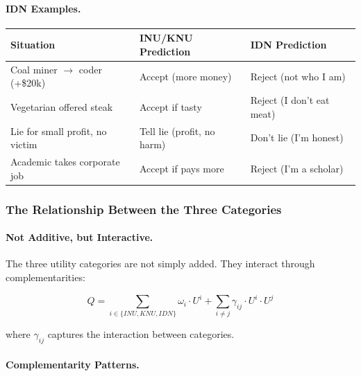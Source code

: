 \paragraph{IDN Examples.}

\begin{center}
\renewcommand{\arraystretch}{1.3}
\begin{tabular}{p{4cm}p{3.5cm}p{4.5cm}}
\toprule
\textbf{Situation} & \textbf{INU/KNU Prediction} & \textbf{IDN Prediction} \\
\midrule
Coal miner $\rightarrow$ coder (+\$20k) & Accept (more money) & Reject (not who I am) \\
Vegetarian offered steak & Accept if tasty & Reject (I don't eat meat) \\
Lie for small profit, no victim & Tell lie (profit, no harm) & Don't lie (I'm honest) \\
Academic takes corporate job & Accept if pays more & Reject (I'm a scholar) \\
\bottomrule
\end{tabular}
\end{center}

\subsubsection{The Relationship Between the Three Categories}

\paragraph{Not Additive, but Interactive.}
The three utility categories are not simply added.
They interact through complementarities:

\begin{equation}
Q = \sum_{i \in \{INU, KNU, IDN\}} \omega_i \cdot U^i + \sum_{i \neq j} \gamma_{ij} \cdot U^i \cdot U^j
\label{eq:utility-complementarity}
\end{equation}

where $\gamma_{ij}$ captures the interaction between categories.

\paragraph{Complementarity Patterns.}

